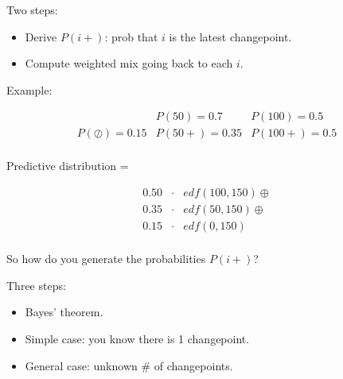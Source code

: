 \documentclass[pdf,letterpaper,allen]{prosper}
\newcommand{\jc}{\oslash}
\begin{document}
\begin{slide}{}

Two steps:

\begin{itemize}

\item Derive $P(i+)$: prob that $i$ is the {\red latest} changepoint.

\item Compute weighted mix going back to each $i$.

\end{itemize}

Example:






\begin{eqnarray*}
& P(50) = 0.7 & P(100) = 0.5 \\
P(\jc) = 0.15 & P(50+) = 0.35 & P(100+) = 0.5 \\
\end{eqnarray*}

\end{slide}

\begin{slide}{}

Predictive distribution = 

\begin{eqnarray*}
0.50  &\cdot & edf(100, 150) \oplus \\
0.35  &\cdot & edf(50, 150) \oplus \\
0.15 &\cdot & edf(0, 150) \\
\end{eqnarray*}



\end{slide}


\begin{slide}{}

So how do you generate the probabilities $P(i+)$?

\vspace{0.1in}

Three steps:

\begin{itemize}

\item Bayes' theorem.

\item Simple case: you know there is 1 changepoint.

\item General case: unknown \# of changepoints.

\end{itemize}


\end{slide}
\end{document}
